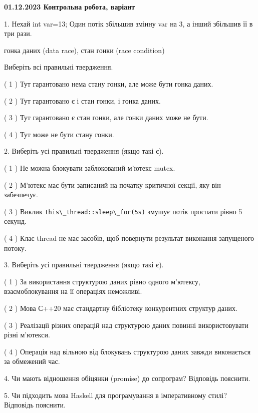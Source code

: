 \documentclass[12pt, ukrainian]{article}
\def\code#1{\Verb!#1!}
\begin{document}
\vspace{4mm}
\newpage
\begin {large}

\textbf{01.12.2023 Контрольна робота, варіант  }\par


{
1. Нехай int var=13; Один потік збільшив змінну var на 3, а інший збільшив її в три рази.

гонка даних (data race), стан гонки (race condition)

Виберіть всі правильні твердження.\par
\vspace{2mm}
( 1 ) Тут гарантовано нема стану гонки, але може бути гонка даних.%

( 2 ) Тут гарантовано є і стан гонки, і гонка даних.%

( 3 ) Тут гарантовано є стан гонки, але гонки даних може не бути.%

( 4 ) Тут може не бути стану гонки.%


\vspace{5mm}
2. Виберіть усі правильні твердження (якщо такі є).\par
\vspace{2mm}

( 1 ) Не можна блокувати заблокований м’ютекс mutex.%

( 2 ) М’ютекс має бути записаний на початку критичної секції, яку він забезпечує.%

( 3 ) Виклик \code{this\_thread::sleep\_for(5s)} змушує потік проспати рівно 5 секунд.%

( 4 ) Клас thread не має засобів, щоб повернути результат виконання запущеного потоку.%


\vspace{5mm}
3. Виберіть усі правильні твердження (якщо такі є).\par
\vspace{2mm}

( 1 ) За використання структурою даних рівно одного м’ютексу, взаємоблокування на її операціях неможливі.%

( 2 ) Мова С++20 має стандартну бібліотеку конкурентних структур даних.%

( 3 ) Реалізації різних операцій над структурою даних повинні використовувати різні м’ютекси.%

( 4 ) Операція над вільною від блокувань структурою даних завжди виконається за обмежений час.%


\vspace{5mm}
4. Чи мають відношення обіцянки (promise) до сопрограм? Відповідь пояснити.



\vspace{5mm}
5. Чи підходить мова Haskell для програмування в імперативному стилі? Відповідь пояснити.
}
\end {large}
\end{document}
